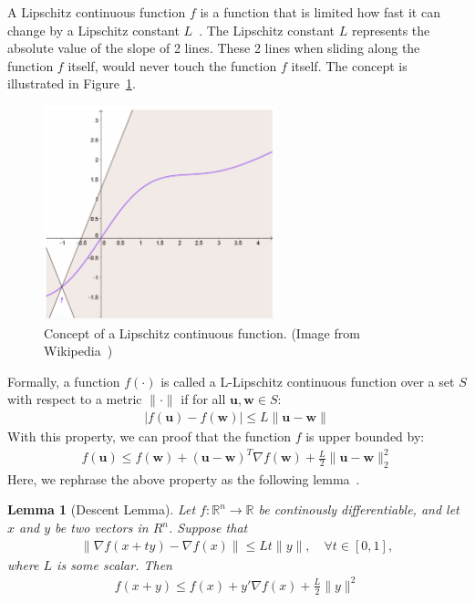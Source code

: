 \documentclass[11pt]{article}
\newtheorem{lemma}[theorem]{Lemma}
\newcommand{\bw}{\boldsymbol{w}}
\newcommand{\bu}{\boldsymbol{u}}
\begin{document}
A Lipschitz continuous function $f$ is a function that is limited how fast it can change by a Lipschitz constant $L$~\cite{l_smooth}. The Lipschitz constant $L$ represents the absolute value of the slope of 2 lines. These 2 lines when sliding along the function $f$ itself, would never touch the function $f$ itself. The concept is illustrated in Figure~\ref{fig:l_smooth}.
%
\begin{figure}[h]
    \centering
    \includegraphics[width=0.6\textwidth]{Img/l_smooth.png}
    \caption{Concept of a Lipschitz continuous function. (Image from Wikipedia~\cite{l_smooth})}
    \label{fig:l_smooth}
\end{figure}
%
Formally, a function $f(\cdot)$ is called a L-Lipschitz continuous function over a set $S$ with respect to a metric $\|\cdot\|$ if for all $\bu, \bw \in S$:
%
\begin{equation*}
\begin{split}
|f(\bu)-f(\bw)| \leq L \|\bu-\bw \|
\end{split}
\end{equation*}
%
With this property, we can proof that the function $f$ is upper bounded by:
%
\begin{equation*}
\begin{split}
f(\bu) \leq f(\bw) + (\bu-\bw)^T \nabla f(\bw) + \frac{L}{2} \|\bu-\bw\|^2_2
\end{split}
\end{equation*}
%
Here, we rephrase the above property as the following lemma~\cite{nonlinear_programming}.

\begin{lemma}[Descent Lemma]
Let $f:\mathbb{R}^n \rightarrow \mathbb{R}$ be continously differentiable, and let $x$ and $y$ be two vectors in $R^n$. Suppose that
\begin{equation*}
\begin{split}
\|\nabla f(x+ty) - \nabla f(x)\| \leq L t\|y\|, \quad \forall t \in [0, 1],
\end{split}
\end{equation*}
where $L$ is some scalar. Then
\begin{equation*}
\begin{split}
f(x+y) \leq f(x) + y'\nabla f(x) + \frac{L}{2} \|y\|^2
\end{split}
\end{equation*}
\end{lemma}
\end{document}
